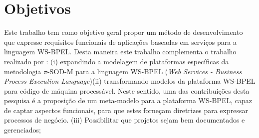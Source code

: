 %
%
%


\section{Objetivos}
\label{goals}

Este trabalho tem como objetivo geral propor um método de desenvolvimento que expresse requisitos funcionais de aplicações baseadas em serviços para a linguagem WS-BPEL. Desta maneira este trabalho complementa o trabalho realizado por \cite{Placido}: (i) expandindo a modelagem de plataformas específicas da metodologia $\pi$-SOD-M para a linguagem WS-BPEL (\textit{Web Services - Business Process Execution Language})(ii) transformando modelos da plataforma WS-BPEL para código de máquina processável. Neste sentido, uma das contribuições desta pesquisa é a proposição de um meta-modelo para a plataforma WS-BPEL, capaz de captar aspectos funcionais, para que estes forneçam diretrizes para expressar processos de negócio. (iii) Possibilitar que projetos sejam bem documentados e gerenciados; 

